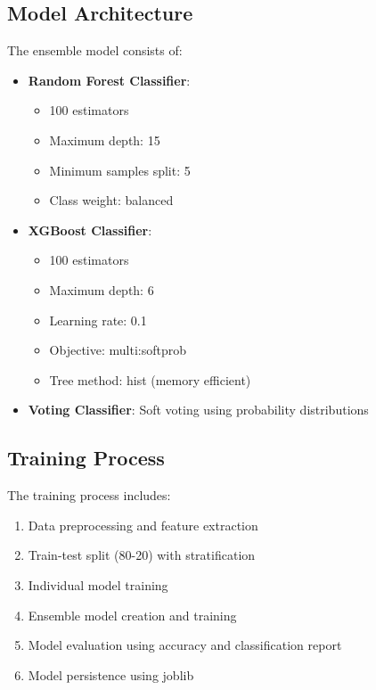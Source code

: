 \subsection{Model Architecture}
The ensemble model consists of:

\begin{itemize}
    \item \textbf{Random Forest Classifier}:
    \begin{itemize}
        \item 100 estimators
        \item Maximum depth: 15
        \item Minimum samples split: 5
        \item Class weight: balanced
    \end{itemize}
    
    \item \textbf{XGBoost Classifier}:
    \begin{itemize}
        \item 100 estimators
        \item Maximum depth: 6
        \item Learning rate: 0.1
        \item Objective: multi:softprob
        \item Tree method: hist (memory efficient)
    \end{itemize}
    
    \item \textbf{Voting Classifier}: Soft voting using probability distributions
\end{itemize}

\subsection{Training Process}
The training process includes:

\begin{enumerate}
    \item Data preprocessing and feature extraction
    \item Train-test split (80-20) with stratification
    \item Individual model training
    \item Ensemble model creation and training
    \item Model evaluation using accuracy and classification report
    \item Model persistence using joblib
\end{enumerate}

